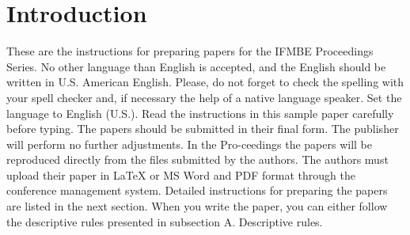 \section{Introduction}

These are the instructions for preparing papers for the IFMBE Proceedings
Series. No other language than English is accepted, and the English should be written 
in U.S. American English. Please, do not forget to check the spelling with 
your spell checker and, if necessary the help of a native language speaker. 
Set the language to English (U.S.). Read the instructions in this sample 
paper carefully before typing.
The papers should be submitted in their final form. The publisher will 
perform no further adjustments. In the Pro-ceedings the papers will be 
reproduced directly from the files submitted by the authors. The authors 
must upload their paper in LaTeX or MS Word and PDF format through the 
conference management system.
Detailed instructions for preparing the papers are listed in the next 
section. When you write the paper, you can either follow the descriptive
rules presented in subsection A. Descriptive rules.